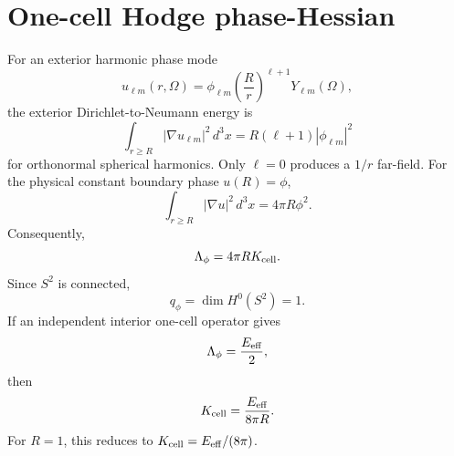 \section{One-cell Hodge phase-Hessian}
For an exterior harmonic phase mode
\[
  u_{\ell m}(r,\Omega)=\phi_{\ell m}\left(\frac{R}{r}\right)^{\ell+1}Y_{\ell m}(\Omega),
\]
the exterior Dirichlet-to-Neumann energy is
\[
  \int_{r\ge R}|\nabla u_{\ell m}|^2\,d^3x
  =
  R(\ell+1)|\phi_{\ell m}|^2
\]
for orthonormal spherical harmonics.  Only \(\ell=0\) produces a \(1/r\)
far-field.  For the physical constant boundary phase \(u(R)=\phi\),
\[
  \int_{r\ge R}|\nabla u|^2\,d^3x=4\pi R\phi^2.
\]
Consequently,
\[
  \Lambda_\phi=4\pi R K_{\rm cell}.
\]
Since \(S^2\) is connected,
\[
  q_\phi=\dim H^0(S^2)=1.
\]
If an independent interior one-cell operator gives
\[
  \Lambda_\phi=\frac{E_{\rm eff}}2,
\]
then
\[
  K_{\rm cell}=\frac{E_{\rm eff}}{8\pi R}.
\]
For \(R=1\), this reduces to \(K_{\rm cell}=E_{\rm eff}/(8\pi)\).
